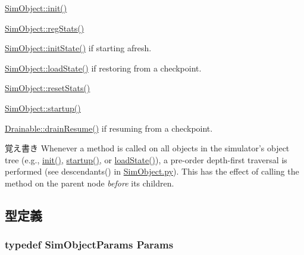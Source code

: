 \begin{DoxyEnumerate}
\item \hyperlink{classSimObject_a02fd73d861ef2e4aabb38c0c9ff82947}{SimObject::init()} 
\item \hyperlink{classSimObject_a4dc637449366fcdfc4e764cdf12d9b11}{SimObject::regStats()} 
\item 
\begin{DoxyItemize}
\item \hyperlink{classSimObject_a3c34ea9b29f410748d4435a667484924}{SimObject::initState()} if starting afresh. 
\item \hyperlink{classSimObject_a0c3e6eb311ceff72035b11f2a5e0f186}{SimObject::loadState()} if restoring from a checkpoint. 
\end{DoxyItemize}
\item \hyperlink{classSimObject_a65880e61108132689a1bd769b9187fb7}{SimObject::resetStats()} 
\item \hyperlink{classSimObject_aecc7d8debf54990ffeaaed5bac7d7d81}{SimObject::startup()} 
\item \hyperlink{classDrainable_a8f020d3237536fe007fc488c4125c5d8}{Drainable::drainResume()} if resuming from a checkpoint. 
\end{DoxyEnumerate}

\begin{DoxyNote}{覚え書き}
Whenever a method is called on all objects in the simulator's object tree (e.g., \hyperlink{classSimObject_a02fd73d861ef2e4aabb38c0c9ff82947}{init()}, \hyperlink{classSimObject_aecc7d8debf54990ffeaaed5bac7d7d81}{startup()}, or \hyperlink{classSimObject_a0c3e6eb311ceff72035b11f2a5e0f186}{loadState()}), a pre-\/order depth-\/first traversal is performed (see descendants() in \hyperlink{SimObject_8py}{SimObject.py}). This has the effect of calling the method on the parent node {\itshape before\/} its children. 
\end{DoxyNote}


\subsection{型定義}
\hypertarget{classSimObject_a0f0761d2db586a23bb2a2880b8f387bb}{
\subsubsection[{Params}]{\setlength{\rightskip}{0pt plus 5cm}typedef SimObjectParams {\bf Params}}}
\label{classSimObject_a0f0761d2db586a23bb2a2880b8f387bb}


